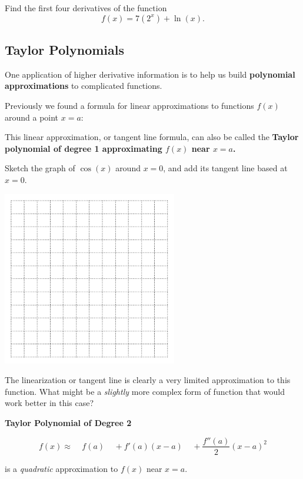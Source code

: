 \problem Find the first four derivatives of the function
$$f(x) = 7 (2^x) + \ln(x).$$


\newpage
{}
\subsection*{Taylor Polynomials}

One application of higher derivative information is to help us build
{\bf polynomial approximations} to complicated functions.

Previously we found a formula for linear approximations to functions
$f(x)$ around a point $x=a$:

\vspace{1.5in}

This linear approximation, or tangent line formula, can also be called
the {\bf Taylor polynomial of degree 1 approximating $f(x)$ near
  $x=a$.}

\newpage

Sketch the graph of $\cos(x)$ around $x=0$, and add its
  tangent line based at $x=0$.

\includegraphics[width=3in]{graphics/empty_graph_square_12}


The linearization or tangent line is clearly a very
  limited approximation to this function.  What might be a {\em
    slightly} more complex form of function that would work better in
  this case?

\vfill

\newpage

\begin{boxnote}

{\bf Taylor Polynomial of Degree 2}
\vspace{1in}

$$ f(x) \approx ~~~~~f(a) ~~~~~+ f'(a) (x-a) ~~~~~+ \frac{f''(a)}{2} (x-a)^2$$  

\vspace{1in}

is a {\em quadratic} approximation to $f(x)$ near $x=a$.
\end{boxnote}


